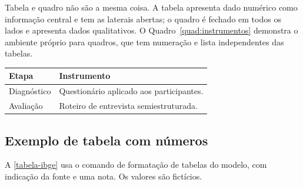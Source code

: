 Tabela e quadro não são a mesma coisa. A tabela apresenta dado numérico
como informação central e tem as laterais abertas; o quadro é fechado em
todos os lados e apresenta dados qualitativos. O
Quadro~\ref{quad:instrumentos} demonstra o ambiente próprio para quadros,
que tem numeração e lista independentes das tabelas.

\begin{quadro}[htb]
  \centering
  \caption{Instrumentos de coleta por etapa: exemplo fictício}
  \label{quad:instrumentos}
  {\ABNTEXfontereduzida
  \begin{tabularx}{\linewidth}{|l|X|}
    \hline
    \textbf{Etapa} & \textbf{Instrumento} \\
    \hline
    Diagnóstico & Questionário aplicado aos participantes. \\
    \hline
    Avaliação & Roteiro de entrevista semiestruturada. \\
    \hline
  \end{tabularx}}
\end{quadro}

\subsection{Exemplo de tabela com números}

A \autoref{tabela-ibge} usa o comando de formatação de tabelas do modelo,
com indicação da fonte e uma nota. Os valores são fictícios.

\begin{table}[htb]
  \centering
\end{table}
